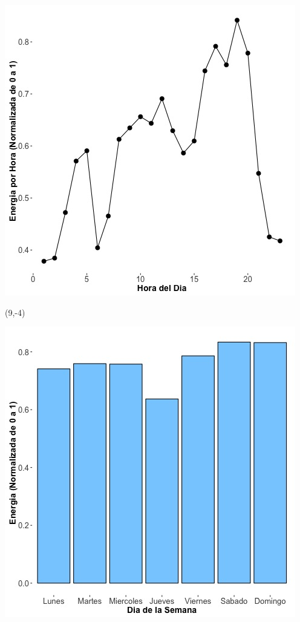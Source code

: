 \documentclass{article}\usepackage[]{graphicx}\usepackage[]{color}
\newenvironment{knitrout}{}{} %
\begin{document}
\begin{knitrout}
\color{fgcolor}
\includegraphics[scale=0.65]{figure/A24_plot_norm_median} 
\end{knitrout}


 \begin{textblock}{1}(9,-4)
\begin{minipage}{20em}
\begingroup

\endgroup
\end{minipage}
\end{textblock}


\begin{knitrout}
\color{fgcolor}
\includegraphics[scale=0.65]{figure/A24_day_of_week_plot} 
\end{knitrout}
\end{document}
